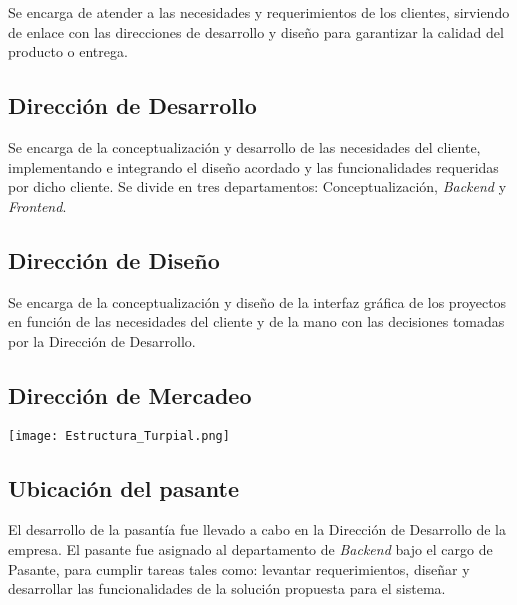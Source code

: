 Se encarga de atender a las necesidades y requerimientos de los clientes, sirviendo de enlace con las direcciones de desarrollo y diseño para garantizar la calidad del producto o entrega. 

\subsection*{Dirección de Desarrollo} 

Se encarga de la conceptualización y desarrollo de las necesidades del cliente, implementando e integrando el diseño acordado y las funcionalidades requeridas por dicho cliente. Se divide en tres departamentos: Conceptualización, \textit{Backend} y \textit{Frontend}.

\subsection*{Dirección de Diseño}

Se encarga de la conceptualización y diseño de la interfaz gráfica de los proyectos en función de las necesidades del cliente y de la mano con las decisiones tomadas por la Dirección de Desarrollo. 

\subsection*{Dirección de Mercadeo}


\texttt{[image: Estructura\_Turpial.png]} \\


\subsection*{Ubicación del pasante}

El desarrollo de la pasantía fue llevado a cabo en la Dirección de Desarrollo de la empresa. El pasante fue asignado al departamento de \textit{Backend} bajo el cargo de Pasante, para cumplir tareas tales como: levantar requerimientos, diseñar y desarrollar las funcionalidades de la solución propuesta para el sistema. 




